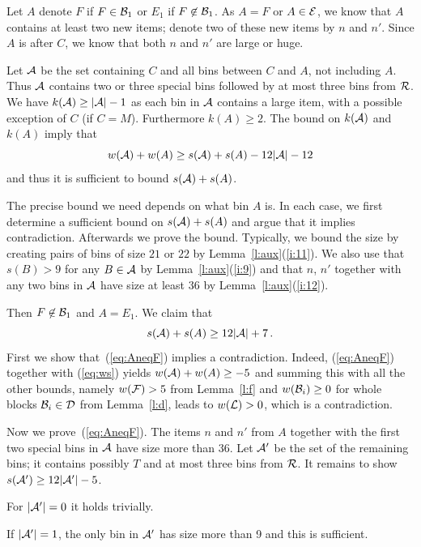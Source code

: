 Let $A$ denote $F$ if $F\in{\mathcal B}_1$ or $E_1$ if $F\not\in{\mathcal B}_1$.  As
$A=F$ or $A\in{\mathcal E}$, we know that $A$ contains at least two new
items; denote two of these new items by $n$ and $n'$. Since $A$ is
after $C$, we know that both $n$ and $n'$ are large or huge.

Let ${\mathcal A}$ be the set
containing $C$ and all bins between $C$ and $A$, not including
$A$. Thus ${\mathcal A}$ contains two or three special bins followed by at
most three bins from ${\mathcal R}$. We have $k({\mathcal A})\geq|{\mathcal A}|-1$ as each
bin in ${\mathcal A}$ contains a large item, with a possible exception of
$C$ (if $C=M$).  Furthermore $k(A)\geq2$. The bound on $k({\mathcal A})$ and
$k(A)$ imply that
\begin{equation}
\label{eq:ws}
w({\mathcal A})+w(A)\geq s({\mathcal A})+s(A)-12|{\mathcal A}|-12   
\end{equation}
and thus it is sufficient to bound $s({\mathcal A})+s(A)$. 

The precise bound we need depends on what bin $A$ is.  In each case,
we first determine a sufficient bound on $s({\mathcal A})+s(A)$ and argue
that it implies contradiction. Afterwards we prove the bound.
Typically, we bound the size by creating pairs of bins of size $21$ or
$22$ by Lemma~\ref{l:aux}(\ref{i:11}). We also use that $s(B)>9$ for
any $B\in{\mathcal A}$ by Lemma~\ref{l:aux}(\ref{i:9}) and that $n$, $n'$
together with any two bins in ${\mathcal A}$ have size at least $36$ by
Lemma~\ref{l:aux}(\ref{i:12}).

Then $F\not\in{\mathcal B}_1$ and $A=E_1$. We claim that 
\begin{equation}
\label{eq:AneqF}
s({\mathcal A})+s(A)\geq12|{\mathcal A}|+7\,.
\end{equation}
First we show that~(\ref{eq:AneqF}) implies a contradiction. Indeed, 
(\ref{eq:AneqF}) together with (\ref{eq:ws}) yields
$w({\mathcal A})+w(A)\geq -5$ and summing this with all the other bounds,
namely $w({\mathcal F})>5$ from Lemma~\ref{l:f} and $w({\mathcal B}_i)\ge0$ for
whole blocks ${\mathcal B}_i\in{\mathcal D}$ from Lemma~\ref{l:d}, leads to
$w({\mathcal L})>0$, which is a contradiction.  

Now we prove~(\ref{eq:AneqF}). The items $n$ and $n'$ from $A$
together with the first two special bins in ${\mathcal A}$ have size more
than 36. Let ${\mathcal A'}$ be the set of the remaining bins; it contains
possibly $T$ and at most three bins from ${\mathcal R}$.  It remains to show
$s({\mathcal A'})\geq 12|{\mathcal A'}|-5$.

For $|{\mathcal A'}|=0$ it holds trivially.  

If $|{\mathcal A'}|=1$, the only bin in ${\mathcal A'}$ has size more than
9 and this is sufficient. 


